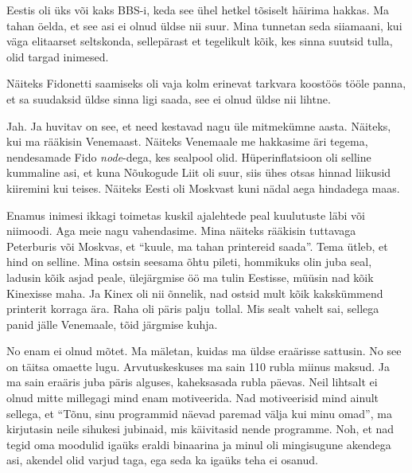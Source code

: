
Eestis oli üks või kaks BBS-i, keda see ühel hetkel tõsiselt häirima hakkas. Ma tahan öelda, et see asi ei olnud üldse nii suur. Mina tunnetan seda siiamaani, kui väga elitaarset seltskonda, sellepärast et tegelikult kõik, kes sinna suutsid tulla, olid targad inimesed. 

Näiteks Fidonetti saamiseks oli vaja kolm erinevat tarkvara koostöös tööle panna, et sa suudaksid üldse sinna ligi saada, see ei olnud üldse nii lihtne. 


Jah. Ja huvitav on see, et need kestavad nagu üle mitmekümne aasta. Näiteks, kui ma rääkisin Venemaast. Näiteks Venemaale me hakkasime äri tegema, nendesamade Fido \emph{node}-dega, kes sealpool olid. Hüperinflatsioon oli selline kummaline asi, et kuna Nõukogude Liit oli suur, siis ühes otsas hinnad liikusid kiiremini kui teises. Näiteks Eesti oli Moskvast kuni nädal aega hindadega maas. 


Enamus inimesi ikkagi toimetas kuskil ajalehtede peal kuulutuste läbi või niimoodi. Aga meie nagu vahendasime. Mina näiteks rääkisin tuttavaga Peterburis või Moskvas, et \enquote{kuule,  ma tahan printereid saada}. Tema ütleb, et hind on selline. Mina ostsin seesama õhtu pileti, hommikuks olin juba seal, ladusin kõik asjad peale, ülejärgmise öö ma tulin Eestisse, müüsin nad kõik Kinexisse maha. Ja Kinex oli nii õnnelik, nad ostsid mult kõik kakskümmend printerit korraga ära. Raha oli päris palju tollal. Mis sealt vahelt sai, sellega panid jälle Venemaale, tõid järgmise kuhja.


No enam ei olnud mõtet. Ma mäletan, kuidas ma üldse eraärisse sattusin. No see on täitsa omaette lugu. Arvutuskeskuses ma sain 110 rubla miinus maksud. Ja ma sain eraäris juba päris alguses, kaheksasada rubla päevas. Neil lihtsalt ei olnud mitte millegagi mind enam motiveerida. Nad motiveerisid mind ainult sellega, et \enquote{Tõnu, sinu programmid näevad paremad välja kui minu omad}, ma kirjutasin neile sihukesi jubinaid, mis käivitasid nende programme. Noh, et nad tegid oma moodulid igaüks eraldi binaarina ja minul oli mingisugune akendega asi, akendel olid varjud taga, ega seda ka igaüks teha ei osanud. 

